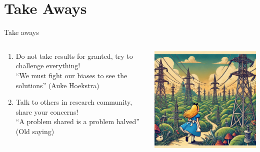 \section{Take Aways}
\begin{frame}{Take aways}

\begin{columns}
\begin{column}{7cm}
  \begin{enumerate}
    \item Do not take results for granted, try to challenge everything! \\
    \enquote{We must fight our biases to see the solutions} (Auke Hoekstra)
    \item Talk to others in research community, share your concerns! \\
    \enquote{A problem shared is a problem halved} (Old saying)
  \end{enumerate}
\end{column}
\begin{column}{8cm}
  \includegraphics[width=8cm]{images/alice.png}
\end{column}
\end{columns}


\end{frame}


